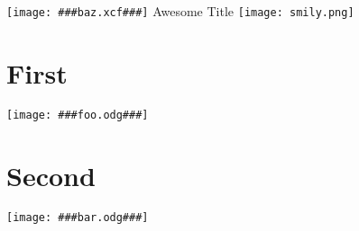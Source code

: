 \documentclass[12pt]{article}
\begin{document}
\begin{center}
\texttt{[image: \#\#\#baz.xcf\#\#\#]}
{\Huge Awesome Title}
\texttt{[image: smily.png]}
\end{center}



\section{First}
\blindtext

\texttt{[image: \#\#\#foo.odg\#\#\#]}


\section{Second}
\blindtext

\texttt{[image: \#\#\#bar.odg\#\#\#]}
\end{document}
